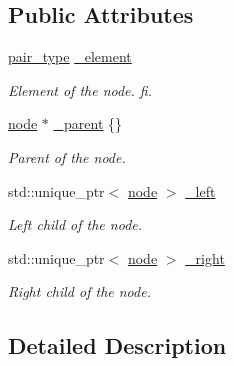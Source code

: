 \subsection*{Public Attributes}
\begin{DoxyCompactItemize}
\item 
\mbox{\label{structbst_1_1node_ad85af5ac81f4ac83c546c16913887845}} 
\hyperlink{classbst_a7b11cca2a3b4394915600194f741ab16}{pair\+\_\+type} \hyperlink{structbst_1_1node_ad85af5ac81f4ac83c546c16913887845}{\+\_\+element}
\begin{DoxyCompactList}\small\item\em Element of the node. fi. \end{DoxyCompactList}\item 
\mbox{\label{structbst_1_1node_a96c0f20c8efbf9e17ec29c150acdc0ed}} 
\hyperlink{structbst_1_1node}{node} $\ast$ \hyperlink{structbst_1_1node_a96c0f20c8efbf9e17ec29c150acdc0ed}{\+\_\+parent} \{\}
\begin{DoxyCompactList}\small\item\em Parent of the node. \end{DoxyCompactList}\item 
\mbox{\label{structbst_1_1node_a72462a1f1920ab43215629445b3fc106}} 
std\+::unique\+\_\+ptr$<$ \hyperlink{structbst_1_1node}{node} $>$ \hyperlink{structbst_1_1node_a72462a1f1920ab43215629445b3fc106}{\+\_\+left}
\begin{DoxyCompactList}\small\item\em Left child of the node. \end{DoxyCompactList}\item 
\mbox{\label{structbst_1_1node_ac891c352566694de0faf0ee19b392f91}} 
std\+::unique\+\_\+ptr$<$ \hyperlink{structbst_1_1node}{node} $>$ \hyperlink{structbst_1_1node_ac891c352566694de0faf0ee19b392f91}{\+\_\+right}
\begin{DoxyCompactList}\small\item\em Right child of the node. \end{DoxyCompactList}\end{DoxyCompactItemize}


\subsection{Detailed Description}
